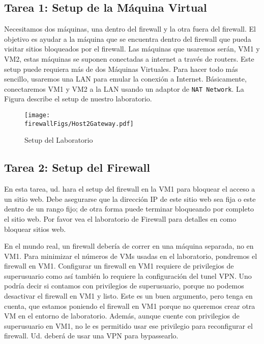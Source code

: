 \subsection{Tarea 1: Setup de la Máquina Virtual}

Necesitamos dos máquinas, una dentro del firewall y la otra fuera del firewall. El objetivo es ayudar a la máquina que se encuentra dentro del firewall que pueda visitar sitios bloqueados por el firewall.
Las máquinas que usaremos serán, VM1 y VM2, estas máquinas se suponen conectadas a internet a través de routers. Este setup puede requiera más de dos Máquinas Virtuales.
Para hacer todo más sencillo, usaremos una LAN para emular la conexión a Internet.
Básicamente, conectaremos VM1 y VM2 a la LAN usando un adaptor de \texttt{NAT Network}. 
La Figura describe el setup de nuestro laboratorio.


\begin{figure}[htb]
  \begin{center}
    \texttt{[image: \\firewallFigs/Host2Gateway.pdf]}
  \end{center}
  \caption{Setup del Laboratorio}
  \label{vpn_firewall:fig:labsetup}
\end{figure}



\subsection{Tarea 2: Setup del Firewall}

En esta tarea, ud. hara el setup del firewall en la VM1 para bloquear el acceso a un sitio web. Debe asegurarse que la dirección IP de este sitio web sea fija o este dentro de un rango fijo; de otra forma puede terminar bloqueando por completo el sitio web. Por favor vea el laboratorio de Firewall para detalles en como bloquear sitios web.

En el mundo real, un firewall debería de correr en una máquina separada, no en VM1. Para minimizar el números de VMs usadas en el laboratorio, pondremos el firewall en VM1. Configurar un firewall en VM1 requiere de privilegios de superusuario como así también lo requiere la configuración del tunel VPN. Uno podría decir si contamos con privilegios de superusuario, porque no podemos desactivar el firewall en VM1 y listo. Este es un buen argumento, pero tenga en cuenta, que estamos poniendo el firewall en VM1 porque no queremos crear otra VM en el entorno de laboratorio. Además, aunque cuente con privilegios de superusuario en VM1, no le es permitido usar ese privilegio para reconfigurar el firewall. Ud. deberá de usar una VPN para bypassearlo.

